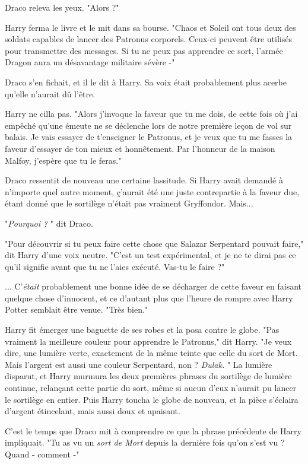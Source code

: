 Draco releva les yeux. "Alors ?"

Harry ferma le livre et le mit dans sa bourse. "Chaos et Soleil ont tous deux des soldats capables de lancer des Patronus corporels. Ceux-ci peuvent être utilisés pour transmettre des messages. Si tu ne peux pas apprendre ce sort, l'armée Dragon aura un désavantage militaire sévère -"

Draco s'en fichait, et il le dit à Harry. Sa voix était probablement plus acerbe qu'elle n'aurait dû l'être.

Harry ne cilla pas. "Alors j'invoque la faveur que tu me dois, de cette fois où j'ai empêché qu'une émeute ne se déclenche lors de notre première leçon de vol sur balais. Je vais essayer de t'enseigner le Patronus, et je veux que tu me fasses la faveur d'essayer de ton mieux et honnêtement. Par l'honneur de la maison Malfoy, j'espère que tu le feras."

Draco ressentit de nouveau une certaine lassitude. Si Harry avait demandé à n'importe quel autre moment, ç'aurait été une juste contrepartie à la faveur due, étant donné que le sortilège n'était pas vraiment Gryffondor. Mais...

"\emph{Pourquoi ?} " dit Draco.

"Pour découvrir si tu peux faire cette chose que Salazar Serpentard pouvait faire," dit Harry d'une voix neutre. "C'est un test expérimental, et je ne te dirai pas ce qu'il signifie avant que tu ne l'aies exécuté. Vas-tu le faire ?"

... C'\emph{était } probablement une bonne idée de se décharger de cette faveur en faisant quelque chose d'innocent, et ce d'autant plus que l'heure de rompre avec Harry Potter semblait être venue. "Très bien."

Harry fit émerger une baguette de ses robes et la posa contre le globe. "Pas vraiment la meilleure couleur pour apprendre le Patronus," dit Harry. "Je veux dire, une lumière verte, exactement de la même teinte que celle du sort de Mort. Mais l'argent est aussi une couleur Serpentard, non ? \emph{Dulak.} " La lumière disparut, et Harry murmura les deux premières phrases du sortilège de lumière continue, relançant cette partie du sort, même si aucun d'eux n'aurait pu lancer le sortilège en entier. Puis Harry toucha le globe de nouveau, et la pièce s'éclaira d'argent étincelant, mais aussi doux et apaisant.

C'est le temps que Draco mit à comprendre ce que la phrase précédente de Harry impliquait. "Tu as vu un \emph{sort de Mort}  depuis la dernière fois qu'on s'est vu ? Quand - comment -"

